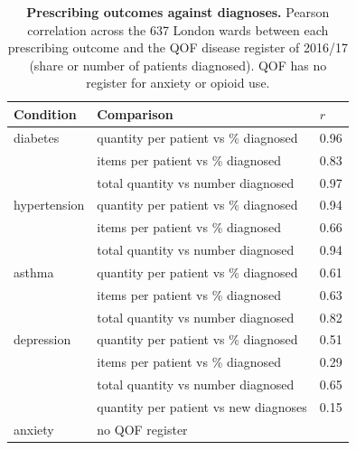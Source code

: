 \begin{table}[hbt!]
\caption{\textbf{Prescribing outcomes against diagnoses.} Pearson correlation across the 637 London wards between each prescribing outcome and the QOF disease register of 2016/17 (share or number of patients diagnosed). QOF has no register for anxiety or opioid use.}\label{tab_qof}
\centering\footnotesize
\begin{tabular*}{0.85\linewidth}{@{\extracolsep{\fill}}lll}
\toprule
Condition & Comparison & $r$ \\
\midrule
diabetes & quantity per patient vs \% diagnosed & 0.96 \\
 & items per patient vs \% diagnosed & 0.83 \\
 & total quantity vs number diagnosed & 0.97 \\
\midrule
hypertension & quantity per patient vs \% diagnosed & 0.94 \\
 & items per patient vs \% diagnosed & 0.66 \\
 & total quantity vs number diagnosed & 0.94 \\
\midrule
asthma & quantity per patient vs \% diagnosed & 0.61 \\
 & items per patient vs \% diagnosed & 0.63 \\
 & total quantity vs number diagnosed & 0.82 \\
\midrule
depression & quantity per patient vs \% diagnosed & 0.51 \\
 & items per patient vs \% diagnosed & 0.29 \\
 & total quantity vs number diagnosed & 0.65 \\
 & quantity per patient vs new diagnoses & 0.15 \\
\midrule
anxiety & no QOF register & \\
\bottomrule
\end{tabular*}
\end{table}
